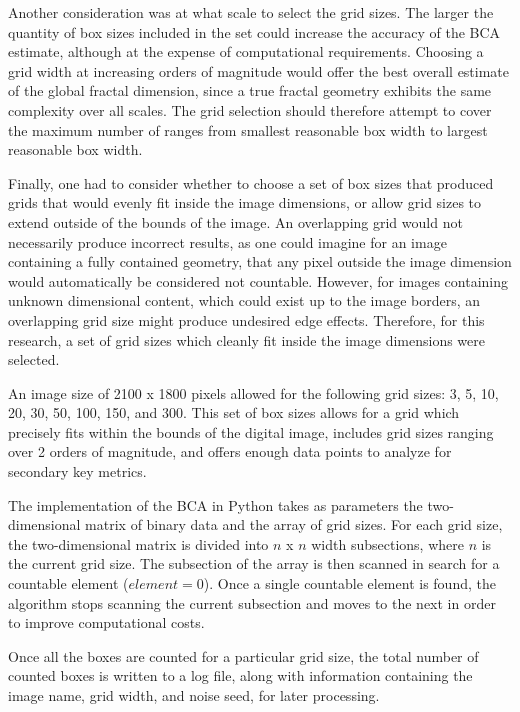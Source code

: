 \documentclass[12pt, oneside]{book}
\begin{document}
Another consideration was at what scale to select the grid sizes.  The larger the quantity of box sizes included in the set could increase the accuracy of the BCA estimate, although at the expense of computational requirements.  Choosing a grid width at increasing orders of magnitude would offer the best overall estimate of the global fractal dimension, since a true fractal geometry exhibits the same complexity over all scales. The grid selection should therefore attempt to cover the maximum number of ranges from smallest reasonable box width to largest reasonable box width.

Finally, one had to consider whether to choose a set of box sizes that produced grids that would evenly fit inside the image dimensions, or allow grid sizes to extend outside of the bounds of the image.  An overlapping grid would not necessarily produce incorrect results, as one could imagine for an image containing a fully contained geometry, that any pixel outside the image dimension would automatically be considered not countable.  However, for images containing unknown dimensional content, which could exist up to the image borders, an overlapping grid size might produce undesired edge effects.  Therefore, for this research, a set of grid sizes which cleanly fit inside the image dimensions were selected.  

An image size of 2100 x 1800 pixels allowed for the following grid sizes:  3, 5, 10, 20, 30, 50, 100, 150, and 300.   This set of box sizes allows for a grid which precisely fits within the bounds of the digital image, includes grid sizes ranging over 2 orders of magnitude, and offers enough data points to analyze for secondary key metrics.

The implementation of the BCA in Python takes as parameters the two-dimensional matrix of binary data and the array of grid sizes.  For each grid size, the two-dimensional matrix is divided into \(n\) x \(n\) width subsections, where \(n\) is the current grid size.  The subsection of the array is then scanned in search for a countable element (\(element = 0\)).  Once a single countable element is found, the algorithm stops scanning the current subsection and moves to the next in order to improve computational costs.

Once all the boxes are counted for a particular grid size, the total number of counted boxes is written to a log file, along with information containing the image name, grid width, and noise seed, for later processing.
% 
%
\end{document}
